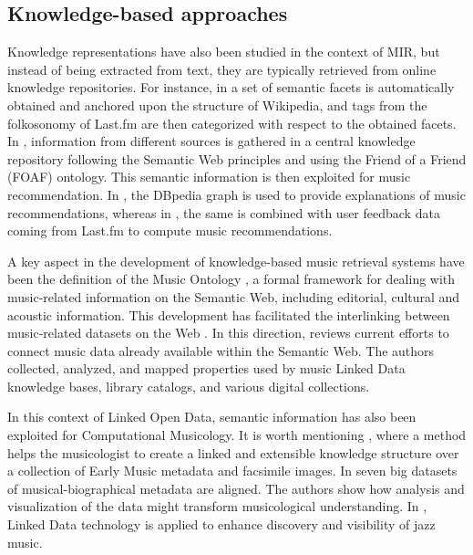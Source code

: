 \subsection{Knowledge-based approaches}
\label{sec:SOA:mir:semantics}

Knowledge representations have also been studied in the context of MIR, but instead of being extracted from text, they are typically retrieved from online knowledge repositories. For instance, in \cite{sordo2013inferring} a set of semantic facets is automatically obtained and anchored upon the structure of Wikipedia, and tags from the folkosonomy of Last.fm are then categorized with respect to the obtained facets. In \cite{Celma:ISWC06}, information from different sources is gathered in a central knowledge repository following the Semantic Web principles and using the Friend of a Friend (FOAF) ontology. This semantic information is then exploited for music recommendation. In \cite{dbrec1}, the DBpedia graph is used to provide explanations of music recommendations, whereas in \cite{Ostuni2013}, the same is combined with user feedback data coming from Last.fm to compute music recommendations. 

A key aspect in the development of knowledge-based music retrieval systems have been the definition of the Music Ontology \citep{raimond2007music}, a formal framework for dealing with music-related information on the Semantic Web, including editorial, cultural and acoustic information. This development has facilitated the interlinking between music-related datasets on the Web \citep{raimond2008automatic}. In this direction, \cite{Gracy2013} reviews current efforts to connect music data already available within the Semantic Web. The authors collected, analyzed, and mapped properties used by music Linked Data knowledge bases, library catalogs, and various digital collections.

In this context of Linked Open Data, semantic information has also been exploited for Computational Musicology. It is worth mentioning \cite{Crawford}, where a method helps the musicologist to create a linked and extensible knowledge structure over a collection of Early Music metadata and facsimile images.  
In \cite{Rose2014} seven big datasets of musical-biographical metadata are aligned. The authors show how analysis and visualization of the data might transform musicological understanding. In \cite{Pattuelli2013}, Linked Data technology is applied to enhance discovery and visibility of jazz music.


